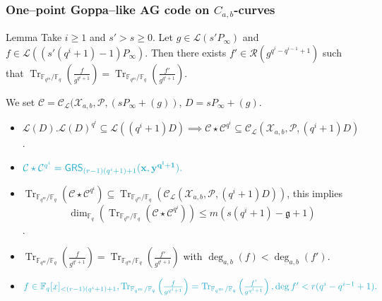 \documentclass[
10pt, %
%
aspectratio=169, %
]{beamer}
\theoremstyle{plain}%
\theoremstyle{definition}
\theoremstyle{remark}
\newcommand{\calP}{\mathcal{P}}
\newcommand{\calL}{\mathcal{L}}
\newcommand{\calC}{\mathcal{C}}
\newcommand{\calR}{\mathcal{R}}
\newcommand{\calX}{\mathcal{X}}
\newcommand{\fq}{\mathbb{F}_{q}}
\newcommand{\Tr}[1]{\operatorname{Tr}_{\mathbb{F}_{q^m}/\fq}\left(#1\right)}
\newcommand{\GRS}{\operatorname{\mathsf{GRS}}}
\newcommand{\degab}[1]{\deg_{a,b}\left(#1\right)}
\begin{document}
\begin{frame}
	\frametitle{One--point Goppa--like AG code on $C_{a,b}$-curves}
	
	\begin{block}{Lemma \cite{lhotel2023goppa}}
		Take $i \geq 1$ and $s'>s \geq 0$. Let $g \in \calL\left(s'P_\infty\right)$ and $f \in \calL\left(\left(s'(q^i+1)-1\right)P_\infty\right)$. Then there exists $f' \in \calR\left(g^{q^i-q^{i-1}+1}\right)$ such that $\Tr{\frac{f}{g^{q^i+1}}} = \Tr{\frac{f'}{g^{q^i+1}}} $.
	\end{block}

	We set $\calC = \calC_{\calL}(\calX_{a,b},\calP,(sP_\infty+(g))$, $D = sP_\infty+(g)$.
	\begin{itemize}
		\item $\calL(D).\calL(D)^{q^i}\subseteq \calL((q^i +1)D) \implies \calC\star\calC^{q^i} \subseteq \calC_{\calL}(\calX_{a,b},\calP,(q^i +1)D)$.
		\item[\textrightarrow] $\mathcolor{ballblue}{\calC\star \calC^{q^i}=\GRS_{(r-1)(q^i+1)+1}(\mathbf{x},\mathbf{y^{q^i+1}}).}$
		\item $\Tr{\calC\star\calC^{q^i}} \subseteq \Tr{\calC_{\calL}(\calX_{a,b},\calP,(q^i +1)D)}$, this implies $$\dim_{\fq}(\Tr{\calC\star\calC^{q^i}}) \leq m(s(q^i +1)-\mathfrak{g} +1)$$.
		\vspace{-0.7em}
		\item $\Tr{\frac{f}{g^{q^i+1}}} = \Tr{\frac{f'}{g^{q^i+1}}}$ with $\degab{f}<\degab{f'}$.
		\item[\textrightarrow] $\mathcolor{ballblue}{f \in \fq[x]_{<(r-1)(q^i+1)+1}, \Tr{\frac{f}{g^{q^i +1}}}=\Tr{\frac{f'}{g^{q^i +1}}}, \deg f'<r(q^i -q^{i-1}+1).}$
	\end{itemize}
\end{frame}
\end{document}
